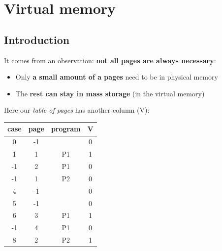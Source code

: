\documentclass{beamer}[10pt, usepdftitle=false, handout]
\begin{document}
	\section{Virtual memory}
	\subsection{Introduction}	
	\begin{frame}
	
	It comes from an observation: \textbf{not all pages are always necessary}:
	\vspace*{1em} 	
	\begin{itemize}
	\item{Only \textbf{a small amount of a pages} need to be in physical memory}
	\item{The \textbf{rest can stay in mass storage} (in the virtual memory)}
	\end{itemize}
	\vspace*{1em}	
	Here our \textit{table of pages} has another column (V)\footnotemark[2]:
	
		\begin{center}
	\begin{tabular}{|c|c|c|c|}
	\hline
	case & page & program & V\\ \hline
	0 & -1 & & 0\\ \hline
	1 & 1 & P1 & 1\\ \hline
	-1 & 2 & P1 & 0\\ \hline
	-1 & 1 & P2 & 0\\ \hline
	4 & -1 & & 0\\ \hline
	5 & -1 & & 0\\ \hline
	6 & 3 & P1 & 1 \\ \hline
	-1 & 4 & P1 & 0 \\ \hline
	8 & 2 & P2 & 1\\ \hline
	
	\end{tabular}	
	\end{center}	
	
	
	
	\end{frame}
		
\end{document}
